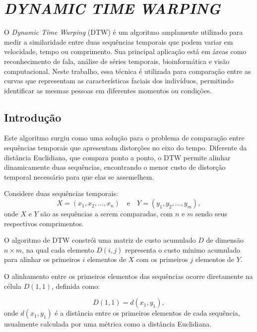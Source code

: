 \chapter{\textit{DYNAMIC TIME WARPING}} \label{cha:dtw}

O \textit{Dynamic Time Warping} (DTW) \cite{tavenard.blog.dtw} é um algoritmo amplamente utilizado para medir a similaridade entre duas sequências temporais que podem variar em velocidade, tempo ou comprimento. Sua principal aplicação está em áreas como reconhecimento de fala, análise de séries temporais, bioinformática e visão computacional. Neste trabalho, essa técnica é utilizada para comparação entre as curvas que representam as características faciais dos indivíduos, permitindo identificar as mesmas pessoas em diferentes momentos ou condições.

\section{Introdução}

Este algoritmo surgiu como uma solução para o problema de comparação entre sequências temporais que apresentam distorções no eixo do tempo. Diferente da distância Euclidiana, que compara ponto a ponto, o DTW permite alinhar dinamicamente duas sequências, encontrando o menor custo de distorção temporal necessário para que elas se assemelhem.

Considere duas sequências temporais:
\begin{equation}
    X = (x_1, x_2, \ldots, x_n) \quad \text{e} \quad Y = (y_1, y_2, \ldots, y_m),
\end{equation}
onde \(X\) e \(Y\) são as sequências a serem comparadas, com \(n\) e \(m\) sendo seus respectivos comprimentos.

O algoritmo de DTW constrói uma matriz de custo acumulado \(D\) de dimensão \(n \times m\), na qual cada elemento \(D(i, j)\) representa o custo mínimo acumulado para alinhar os primeiros \(i\) elementos de \(X\) com os primeiros \(j\) elementos de \(Y\).

O alinhamento entre os primeiros elementos das sequências ocorre diretamente na célula \(D(1,1)\), definida como:

\begin{equation}
    D(1,1) = d(x_1, y_1),
\end{equation}
onde \(d(x_1, y_1)\) é a distância entre os primeiros elementos de cada sequência, usualmente calculada por uma métrica como a distância Euclidiana.

